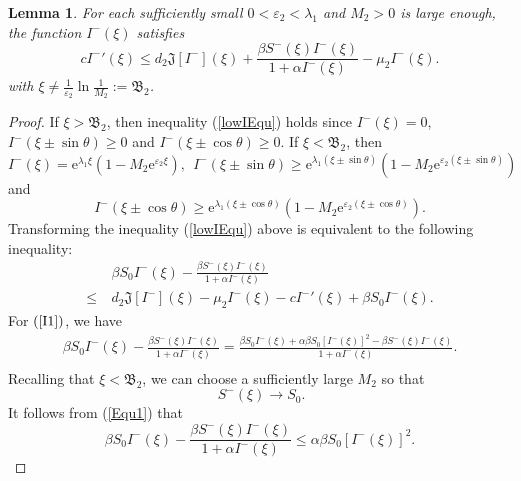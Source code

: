 \documentclass[final,3p,times]{elsarticle}
\newtheorem{lemma}{Lemma}[section]
\numberwithin{equation}{section}
\begin{document}
\begin{lemma}\label{LemLowI}
For each sufficiently small $0<\varepsilon_2<\lambda_1$  and $M_2>0$ is large enough, the function $ I^-(\xi)$ satisfies
\begin{equation}\label{lowIEqu}
c {I^-}'(\xi) \leqslant d_2\mathfrak{J}[I^-](\xi) + \frac{\beta S^-(\xi) I^-(\xi)}{1+\alpha I^-(\xi)} - \mu_2 I^-(\xi).
\end{equation}
with $\xi \neq \frac{1}{\varepsilon_2}\ln \frac{1}{M_2}:=\mathfrak{B}_2$.
\end{lemma}
\begin{proof}
If $\xi > \mathfrak{B}_2$, then inequality (\ref{lowIEqu}) holds since $I^-(\xi)=0$, $I^-(\xi\pm\sin\theta) \geqslant 0$  and $I^-(\xi\pm\cos\theta) \geqslant 0$. If $\xi < \mathfrak{B}_2$, then
\[
I^-(\xi)=\mathrm{e}^{\lambda_1\xi}(1-M_2\mathrm{e}^{\varepsilon_2 \xi}),\ \ I^-(\xi\pm\sin\theta)\geqslant \mathrm{e}^{\lambda_1(\xi\pm\sin\theta)}(1-M_2\mathrm{e}^{\varepsilon_2 (\xi\pm\sin\theta)})
\]
and
\[
I^-(\xi\pm\cos\theta)\geqslant \mathrm{e}^{\lambda_1(\xi\pm\cos\theta)}(1-M_2\mathrm{e}^{\varepsilon_2 (\xi\pm\cos\theta)}).
\]
Transforming the inequality (\ref{lowIEqu}) above is equivalent to the following inequality:
\begin{align}\label{I1}
& \ \beta S_0  I^-(\xi) - \frac{\beta S^-(\xi) I^-(\xi)}{1+\alpha I^-(\xi)}\\ \nonumber
\leq & \ d_2\mathfrak{J}[I^-] (\xi) - \mu_2  I^-(\xi) - c{ I^-}'(\xi) + \beta S_0  I^-(\xi).
\end{align}
For $(\ref{I1})$, we have
\begin{align}\label{Equ1}
\nonumber \beta S_0  I^-(\xi) - \frac{\beta S^-(\xi) I^-(\xi)}{1+\alpha I^-(\xi)} = \frac{\beta S_0  I^-(\xi)+\alpha\beta S_0  [I^-(\xi)]^{2}-\beta S^-(\xi) I^-(\xi)}{1+\alpha I^-(\xi)}.\\
\end{align}
Recalling that $\xi<\mathfrak{B}_2$, we can choose a sufficiently large $M_2$ so that
\[
 \  S^-(\xi)\rightarrow S_0.
\]
It follows from (\ref{Equ1}) that
\[
\beta S_0  I^-(\xi) - \frac{\beta S^-(\xi) I^-(\xi)}{1+\alpha I^-(\xi)} \leq \alpha\beta S_0 [ I^-(\xi)]^2.
\]
\end{proof}
\end{document}
